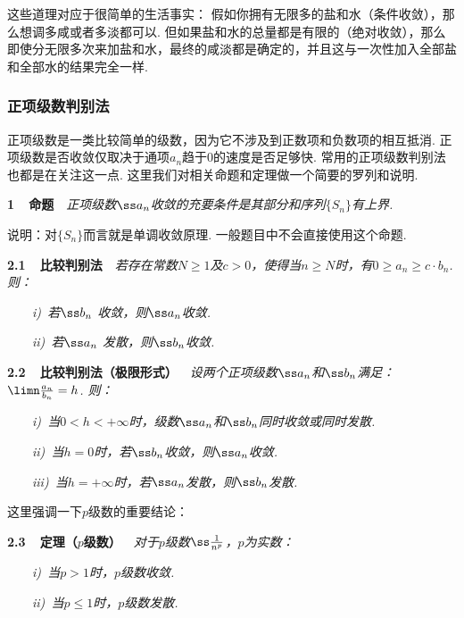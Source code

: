 这些道理对应于很简单的生活事实：
假如你拥有无限多的盐和水（条件收敛），那么想调多咸或者多淡都可以.
但如果盐和水的总量都是有限的（绝对收敛），那么即使分无限多次来加盐和水，最终的咸淡都是确定的，并且这与一次性加入全部盐和全部水的结果完全一样.

\subsubsection{正项级数判别法}

正项级数是一类比较简单的级数，因为它不涉及到正数项和负数项的相互抵消.
正项级数是否收敛仅取决于通项$a_n$趋于$0$的速度是否足够快.
常用的正项级数判别法也都是在关注这一点.
这里我们对相关命题和定理做一个简要的罗列和说明.\vspace{1em}

\textbf{1~~命题}~~\textit{正项级数$\ss a_n$收敛的充要条件是其部分和序列$\{ S_n \}$有上界.}\vspace{0.5em}

说明：对$\{ S_n \}$而言就是单调收敛原理. 一般题目中不会直接使用这个命题.    \vspace{1em}

\textbf{2.1~~比较判别法}~~\textit{若存在常数$N \ge 1$及$c > 0$，使得当$n \ge N$时，有$0 \ge a_n \ge c \cdot b_n$. 则：}

~~~~\textit{i)~若$\ss b_n$ 收敛，则$\ss a_n$收敛.}

~~~~\textit{ii)~若$\ss a_n$ 发散，则$\ss b_n$收敛.}\vspace{0.5em}

\textbf{2.2~~比较判别法（极限形式）}~~\textit{设两个正项级数$\ss a_n$和$\ss b_n$满足：$\limn \frac{a_n}{b_n} = h$. 则：}

~~~~\textit{i)~当$0 < h < +\infty$时，级数$\ss a_n$和$\ss b_n$同时收敛或同时发散.}

~~~~\textit{ii)~当$h=0$时，若$\ss b_n$收敛，则$\ss a_n$收敛.}

~~~~\textit{iii)~当$h = +\infty$时，若$\ss a_n$发散，则$\ss b_n$发散.} \vspace{1em}

这里强调一下$p$级数的重要结论：\vspace{0.5em}

\textbf{2.3~~定理（$p$级数）}~~\textit{对于$p$级数$\ss \frac{1}{n^p}$，$p$为实数：}

~~~~\textit{i)~当$p>1$时，$p$级数收敛.}

~~~~\textit{ii)~当$p \le 1$时，$p$级数发散.}\vspace{0.5em}

